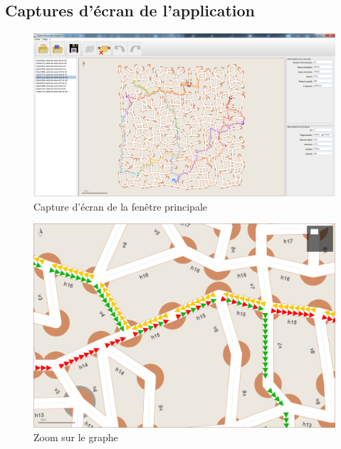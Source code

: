 \begin{landscape}
\section{Captures d'écran de l'application}

\begin{figure}[h]
    \centering
    \includegraphics[width=200mm]{./images/screenshot1.png}
    \caption{Capture d'écran de la fenêtre principale}
\end{figure}
\end{landscape}
\pagebreak

\begin{landscape}
\begin{figure}[h]
    \centering
    \includegraphics[width=240mm]{./images/screenshot2.png}
    \caption{Zoom sur le graphe}
\end{figure}
\end{landscape}
\pagebreak

